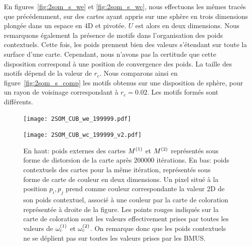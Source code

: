 \documentclass[../main]{subfiles}
\begin{document}
En figures~\ref{fig:2som_s_we} et \ref{fig:2som_s_wc}, nous effectuons les mêmes tracés que précédemment, sur des cartes ayant appris sur une sphère en trois dimensions plongée dans un espace en 4D et pivotée. $U$ est alors en deux dimensions.
Nous remarquons également la présence de motifs dans l'organisation des poids contextuels. Cette fois, les poids prennent bien des valeurs s'étendant sur toute la surface d'une carte.
Cependant, nous n'avons pas la certitude que cette disposition correspond à une position de convergence des poids. 
La taille des motifs dépend de la valeur de $r_c$. Nous comparons ainsi en figure~\ref{fig:2som_s_comp} les motifs obtenus sur une disposition de sphère, pour un rayon de voisinage correspondant à $r_c = 0.02$. Les motifs formés sont différents.



\begin{figure}
	\begin{minipage}{\textwidth}
		\centering\texttt{[image: 2SOM\_CUB\_we\_199999.pdf]}
		\label{fig:2som_cub_we}
	\end{minipage}
	\begin{minipage}{\textwidth}
		\texttt{[image: 2SOM\_CUB\_wc\_199999\_v2.pdf]}
		\caption{En haut: poids externes des cartes $M^{({1})}$ et $M^{({2})}$ représentés sous forme de distorsion de la carte après 200000 itérations.
	En bas: poids contextuels des cartes pour la même itération, représentés sous forme de carte de couleur en deux dimensions. Un pixel situé à la position $p_i,p_j$ prend comme couleur correspondante la valeur 2D de son poids contextuel, associé à une couleur par la carte de coloration représentée à droite de la figure.
	Les points rouges indiqués sur la carte de coloration sont les valeurs effectivement prises par toutes les valeurs de $\omega_c^{(1)}$ et $\omega_c^{(2)}$. On remarque donc que les poids contextuels ne se déplient pas sur toutes les valeurs prises par les BMUS.\label{fig:2som_cub_wc}}
	\end{minipage}
\end{figure}
\end{document}
